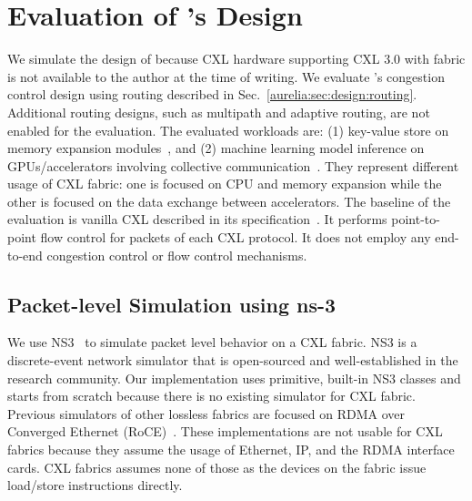 \section{Evaluation of \aurelia's Design}
\label{aurelia:sec:eval}
%
We simulate the design of \aurelia because CXL hardware supporting CXL 3.0 with fabric is not available to the author at the time of writing.
%
We evaluate \aurelia's congestion control design using routing described in Sec.~\ref{aurelia:sec:design:routing}. 
%
Additional routing designs, such as multipath and adaptive routing, are not enabled for the evaluation.
%
The evaluated workloads are: (1) key-value store on memory expansion modules~\cite{samsung-memory-expander:hcs:2022}, and (2) machine learning model inference on GPUs/accelerators involving collective communication~\cite{aws-inferentia:2019}.
%
They represent different usage of CXL fabric: one is focused on CPU and memory expansion while the other is focused on the data exchange between accelerators.
%
The baseline of the evaluation is vanilla CXL described in its specification~\cite{cxl-3-0-spec}.
%
It performs point-to-point flow control for packets of each CXL protocol.
%
It does not employ any end-to-end congestion control or flow control mechanisms.
%


\subsection{Packet-level Simulation using ns-3}
\label{aurelia:sec:eval:ns3-simulation}
We use NS3~\cite{ns-3} to simulate packet level behavior on a CXL fabric.
%  
NS3 is a discrete-event network simulator that is open-sourced and well-established in the research community. 
%
Our implementation uses primitive, built-in NS3 classes and starts from scratch because there is no existing simulator for CXL fabric. 
%
Previous simulators of other lossless fabrics are focused on RDMA over Converged Ethernet (RoCE)~\cite{dcqcn:sigcomm:2015, hpcc:sigcomm:2019,pint:sigcomm:2020}.
%
These implementations are not usable for CXL fabrics because they assume the usage of Ethernet, IP, and the RDMA interface cards.
%
CXL fabrics assumes none of those as the devices on the fabric issue load/store instructions directly.   
%

